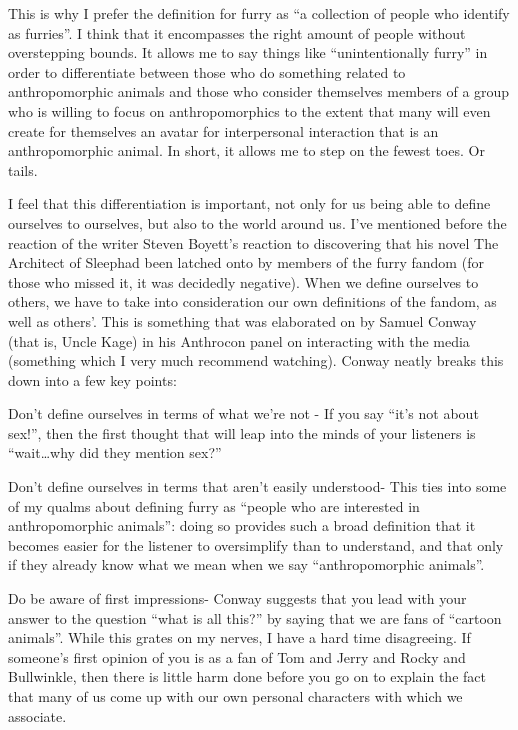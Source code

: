 This is why I prefer the definition for furry as ``a collection of people who identify as furries''. I think that it encompasses the right amount of people without overstepping bounds. It allows me to say things like ``unintentionally furry'' in order to differentiate between those who do something related to anthropomorphic animals and those who consider themselves members of a group who is willing to focus on anthropomorphics to the extent that many will even create for themselves an avatar for interpersonal interaction that is an anthropomorphic animal. In short, it allows me to step on the fewest toes. Or tails.

I feel that this differentiation is important, not only for us being able to define ourselves to ourselves, but also to the world around us. I've mentioned before the reaction of the writer Steven Boyett's reaction to discovering that his novel The Architect of Sleephad been latched onto by members of the furry fandom (for those who missed it, it was decidedly negative). When we define ourselves to others, we have to take into consideration our own definitions of the fandom, as well as others'. This is something that was elaborated on by Samuel Conway (that is, Uncle Kage) in his Anthrocon panel on interacting with the media (something which I very much recommend watching). Conway neatly breaks this down into a few key points:

Don't define ourselves in terms of what we're not - If you say ``it's not about sex!'', then the first thought that will leap into the minds of your listeners is ``wait\ldots{}why did they mention sex?''

Don't define ourselves in terms that aren't easily understood- This ties into some of my qualms about defining furry as ``people who are interested in anthropomorphic animals'': doing so provides such a broad definition that it becomes easier for the listener to oversimplify than to understand, and that only if they already know what we mean when we say ``anthropomorphic animals''.

Do be aware of first impressions- Conway suggests that you lead with your answer to the question ``what is all this?'' by saying that we are fans of ``cartoon animals''. While this grates on my nerves, I have a hard time disagreeing. If someone's first opinion of you is as a fan of Tom and Jerry and Rocky and Bullwinkle, then there is little harm done before you go on to explain the fact that many of us come up with our own personal characters with which we associate.

